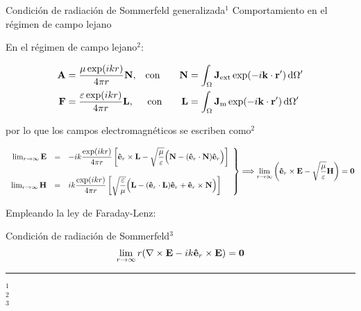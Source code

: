 \begin{frame}{Condición de radiación de Sommerfeld generalizada$^1$}
{Comportamiento en el régimen de campo lejano \hyperlink{fr:Apoyo}{\beamerreturnbutton{}}}\small

En el régimen de campo lejano$^2$:

\begin{align*}
    \vb{A} &= \dfrac{\mu\exp(ikr)}{4\pi r}\vb{N},         &\text{con} \qquad \vb{N} &= \int_\Omega \vb{J}_\text{ext}  \exp(-i\vb{k}\cdot\vb{r}')\dd{\Omega'}\\
    \vb{F} &= \dfrac{\varepsilon\exp(ikr)}{4\pi r}\vb{L}, &\text{con} \qquad \vb{L} &= \int_\Omega \vb{J}_\text{m}  \exp(-i\vb{k}\cdot\vb{r}')\dd{\Omega'}
\end{align*}

por lo que los campos electromagnéticos se escriben como$^2$

\begin{align*}
    \left.
    \begin{array}{rcl}
    \lim_{r\to\infty}\vb{E} &=& -i k\dfrac{\exp(ikr)}{4\pi r}
                \left[ \vu{e}_r\times\vb{L}-\sqrt{\dfrac{\mu}{\varepsilon}}  \Big(\vb{N}-(\vu{e}_r\cdot\vb{N})\vu{e}_r\Big) \right]
           \\ \\
    \lim_{r\to\infty}\vb{H} &=& i k\dfrac{\exp(ikr)}{4\pi r}
                \left[\sqrt{\dfrac{\varepsilon}{\mu}}  \Big(\vb{L}-(\vu{e}_r\cdot\vb{L})\vu{e}_r + \vu{e}_r\times\vb{N}\Big) \right]
    \end{array}
    \right\}
    \Longrightarrow\lim_{r\to\infty} \qty(\vu{e}_r\times\vb{E} - \sqrt{\dfrac{\mu}{\varepsilon}} \vb{H}) = \vb{0}
\end{align*}

Empleando la ley de Faraday-Lenz:

\begin{alertblock}{Condición de radiación de Sommerfeld$^3$}
    $$\lim_{r\to \infty} r\qty(\nabla\times \vb{E} - i k \vu{e}_r\times\vb{E}) = \vb{0}$$
\end{alertblock}%


\vspace*{-0.5em}
	\noindent\rule{.25\textwidth}{0.4pt}
 \begin{spacing}{0}\fontsize{4}{12} \selectfont
	$^1$ \\
	$^2$ \\
	$^3$ 
	\end{spacing}

\end{frame}
